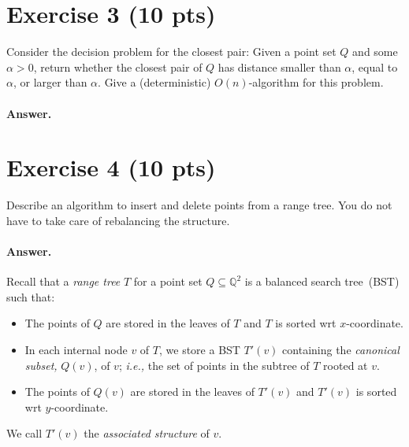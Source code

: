\documentclass[a4paper]{article}
\newcommand{\QQ}{\mathbb{Q}}
\newcommand{\ie}{\emph{i.e.,} }
\begin{document}
\section*{Exercise 3 (10 pts)}

Consider the decision problem for the closest pair:
Given a point set $Q$ and some $\alpha > 0$, return whether the closest pair of $Q$ has distance smaller than $\alpha$, equal to $\alpha$, or larger than $\alpha$.
Give a (deterministic) $O(n)$-algorithm for this problem.

\paragraph{Answer.}


\section*{Exercise 4 (10 pts)}

Describe an algorithm to insert and delete points from a range tree.
You do not have to take care of rebalancing the structure.

\paragraph{Answer.}

Recall that a \emph{range tree} $T$ for a point set $Q \subseteq \QQ^2$ is a balanced search tree~(BST) such that:
\begin{itemize}
	\item The points of $Q$ are stored in the leaves of $T$ and $T$ is sorted wrt $x$-coordinate.
	
	\item In each internal node $v$ of $T$, we store a BST $T'(v)$ containing the \emph{canonical subset,} $Q(v)$, of $v$; \ie the set of points in the subtree of $T$ rooted at $v$.
	
	\item The points of $Q(v)$ are stored in the leaves of $T'(v)$ and $T'(v)$ is sorted wrt $y$-coordinate.
	
\end{itemize}
We call $T'(v)$ the \emph{associated structure} of $v$.

\newcommand{\AEMP}{\mathsf{AEmp}}%
\newcommand{\AINT}{\mathsf{AInt}}%
\newcommand{\ALEAF}{\mathsf{ALeaf}}%
\newcommand{\Akey}{\text{Akey}}%
\newcommand{\Ainsert}{\text{Ainsert}}%
\newcommand{\Adelete}{\text{Adelete}}%
\newcommand{\Arepair}{\text{Arepair}}%
\newcommand{\IF}{\mathrel{\text{if}}}%
\newcommand{\AND}{\mathrel{\text{and}}}%
\newcommand{\WHERE}{\mathrel{\text{where}}}%
\end{document}
